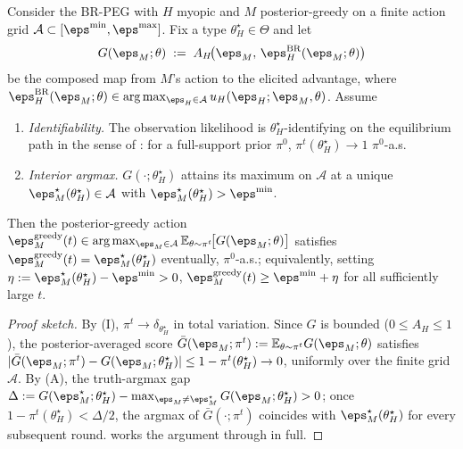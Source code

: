 \begin{proposition}
\label{prop:bayesian-not-min}
Consider the BR-PEG with $H$ myopic and $M$ posterior-greedy on a
finite action grid $\mathcal{A} \subset [\eps^{\min}, \eps^{\max}]$.
Fix a type $\theta_H^\star \in \Theta$ and let
\[
G(\eps_M; \theta) \;:=\; A_H\!\bigl(\eps_M,\, \eps_H^{\mathrm{BR}}(\eps_M; \theta)\bigr)
\]
be the composed map from $M$'s action to the elicited advantage, where
$\eps_H^{\mathrm{BR}}(\eps_M; \theta) \in \arg\max_{\eps_H \in
\mathcal{A}} u_H(\eps_H; \eps_M, \theta)$. Assume
\begin{enumerate}
\item[\normalfont(I)] \emph{Identifiability.} The observation
likelihood is $\theta_H^\star$-identifying on the equilibrium path in
the sense of \citet{kalai1993rational}: for a full-support prior
$\pi^0$, $\pi^t(\theta_H^\star) \to 1$ $\pi^0$-a.s.
\item[\normalfont(A)] \emph{Interior argmax.} $G(\cdot; \theta_H^\star)$
attains its maximum on $\mathcal{A}$ at a unique
$\eps_M^\star(\theta_H^\star) \in \mathcal{A}$ with
$\eps_M^\star(\theta_H^\star) > \eps^{\min}$.
\end{enumerate}
Then the posterior-greedy action
$\eps_M^{\mathrm{greedy}}(t) \in \arg\max_{\eps_M \in \mathcal{A}}
\mathbb{E}_{\theta \sim \pi^t}\!\bigl[G(\eps_M; \theta)\bigr]$
satisfies
$\eps_M^{\mathrm{greedy}}(t) = \eps_M^\star(\theta_H^\star)$
eventually, $\pi^0$-a.s.; equivalently, setting
$\eta := \eps_M^\star(\theta_H^\star) - \eps^{\min} > 0$,
$\eps_M^{\mathrm{greedy}}(t) \geq \eps^{\min} + \eta$ for all
sufficiently large $t$.
\end{proposition}

\begin{proof}[Proof sketch]
By (I), $\pi^t \to \delta_{\theta_H^\star}$ in total variation. Since
$G$ is bounded ($0 \leq A_H \leq 1$), the posterior-averaged score
$\bar G(\eps_M; \pi^t) := \mathbb{E}_{\theta \sim \pi^t} G(\eps_M;
\theta)$ satisfies
$|\bar G(\eps_M; \pi^t) - G(\eps_M; \theta_H^\star)| \leq 1 -
\pi^t(\theta_H^\star) \to 0$, uniformly over the finite grid
$\mathcal{A}$. By (A), the truth-argmax gap
$\Delta := G(\eps_M^\star; \theta_H^\star) - \max_{\eps_M \neq
\eps_M^\star} G(\eps_M; \theta_H^\star) > 0$; once
$1 - \pi^t(\theta_H^\star) < \Delta/2$, the argmax of
$\bar G(\cdot; \pi^t)$ coincides with $\eps_M^\star(\theta_H^\star)$
for every subsequent round.  works the argument
through in full.
\end{proof}

